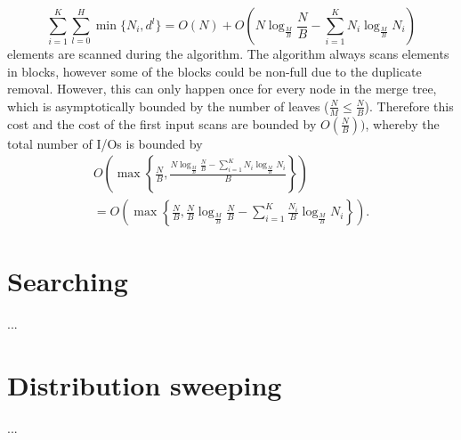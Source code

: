 \documentclass[a4paper,12pt]{article}
\begin{document}
\[
  \sum_{i=1}^K \sum_{l = 0}^H \min\{N_i, d^l\} = O(N) + O\left( N \log_{\frac{M}{B}}{\frac{N}{B}} - \sum_{i = 1}^K N_i \log_{\frac{M}{B}}{N_i} \right)
\]
elements are scanned during the algorithm. The algorithm always scans elements in blocks, however some of the blocks could be non-full due to the duplicate removal. However, this can only happen once for every node in the merge tree, which is asymptotically bounded by the number of leaves ($\frac{N}{M} \leq \frac{N}{B}$). Therefore this cost and the cost of the first input scans are bounded by $O(\frac{N}{B}))$, whereby the total number of I/Os is bounded by
\begin{align*}
  O\left( \max\left\{ \frac{N}{B}, \frac{N \log_{\frac{M}{B}}{\frac{N}{B}} - \sum_{i = 1}^K N_i \log_{\frac{M}{B}}{N_i}}{B} \right\} \right) \\
    = O\left( \max\left\{ \frac{N}{B}, \frac{N}{B} \log_{\frac{M}{B}}{\frac{N}{B}} - \sum_{i=1}^K \frac{N_i}{B} \log_{\frac{M}{B}}{N_i} \right\} \right).
\end{align*}

\section{Searching}

...

\section{Distribution sweeping}

...

%
\end{document}
